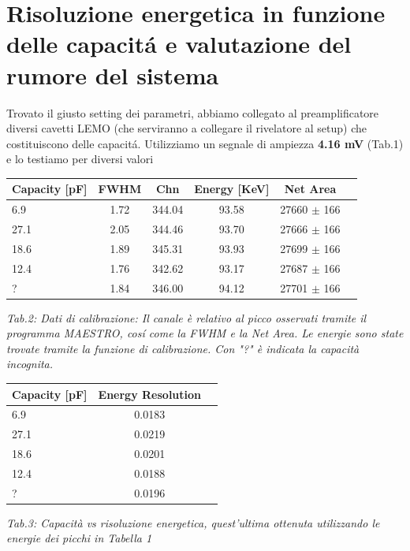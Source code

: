 \documentclass[a4paper]{article}
\begin{document}
\newpage

\section{Risoluzione energetica in funzione delle capacit\'a e valutazione del rumore del sistema}

Trovato il giusto setting dei parametri, abbiamo collegato al preamplificatore diversi cavetti LEMO (che serviranno a collegare il rivelatore al setup) che costituiscono delle capacit\'a. Utilizziamo un segnale di ampiezza \textbf{4.16 mV} (Tab.1) e lo testiamo per diversi valori 

\begin{center} 
		
		\begin{tabular}{lccccc}
			\hline
			\hline
			\textbf{Capacity} [pF]   &     \textbf{FWHM}         	&  \textbf{Chn}              &  \textbf{Energy} [KeV]  &   \textbf{Net Area}    	 \\
			\hline
			\hline
				       6.9                      & 1.72  			&       344.04			        &      		93.58	&	27660 $\pm$ 166						\\
				       27.1                   &  2.05 			&        344.46    			&	93.70	  	&	27666 $\pm$ 166			  			\\
				       18.6		        &  1.89 			&       345.31  			        & 		93.93      & 	27699 $\pm$ 166			 			\\
				       12.4		        & 1.76 			&        342.62 			      & 		93.17 	& 	27687 $\pm$ 166						\\
			    		?			&1.84			&	  346.00			       &		94.12	&	27701 $\pm$ 166							\\
			\hline
			\hline
		\end{tabular}
		\linebreak
		\emph{Tab.2: Dati di calibrazione: Il canale è relativo al picco osservati tramite il programma MAESTRO, cos\'i come la FWHM e la Net Area. Le energie sono state trovate tramite la funzione di calibrazione. Con "?" è indicata la capacità incognita.} 
	\end{center}
	
\begin{center} 
		
		\begin{tabular}{lcc}
			\hline
			\hline
			\textbf{Capacity} [pF]   &     \textbf{Energy Resolution} 	 \\
			\hline
			\hline
				       6.9              &	0.0183 \\
				       27.1             &	0.0219 \\
				       18.6		        &	0.0201 \\
				       12.4		        & 	0.0188 \\
			    		?			    &  	0.0196 \\
			\hline
			\hline
		\end{tabular}
		\linebreak
		\emph{Tab.3: Capacità vs risoluzione energetica, quest'ultima ottenuta utilizzando le energie dei picchi in Tabella 1} 
	\end{center} 	
	
\end{document}
